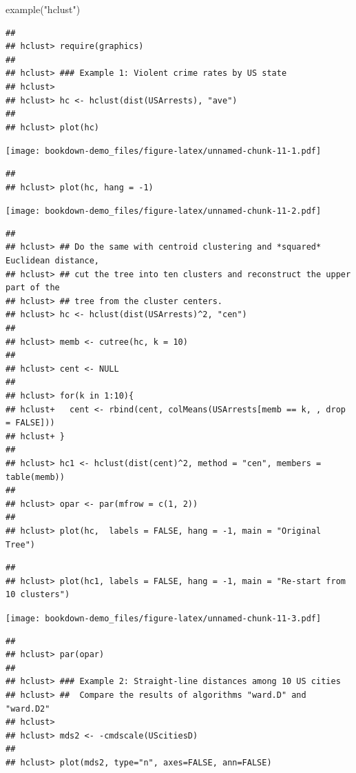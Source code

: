\documentclass[
]{book}
\newenvironment{Shaded}{\begin{snugshade}}{\end{snugshade}}
\newcommand{\FunctionTok}[1]{\textcolor[rgb]{0.00,0.00,0.00}{#1}}
\newcommand{\NormalTok}[1]{#1}
\newcommand{\StringTok}[1]{\textcolor[rgb]{0.31,0.60,0.02}{#1}}
\begin{document}
\begin{Shaded}
\begin{Highlighting}[]
\FunctionTok{example}\NormalTok{(}\StringTok{"hclust"}\NormalTok{)}
\end{Highlighting}
\end{Shaded}

\begin{verbatim}
## 
## hclust> require(graphics)
## 
## hclust> ### Example 1: Violent crime rates by US state
## hclust> 
## hclust> hc <- hclust(dist(USArrests), "ave")
## 
## hclust> plot(hc)
\end{verbatim}

\texttt{[image: bookdown-demo\_files/figure-latex/unnamed-chunk-11-1.pdf]}

\begin{verbatim}
## 
## hclust> plot(hc, hang = -1)
\end{verbatim}

\texttt{[image: bookdown-demo\_files/figure-latex/unnamed-chunk-11-2.pdf]}

\begin{verbatim}
## 
## hclust> ## Do the same with centroid clustering and *squared* Euclidean distance,
## hclust> ## cut the tree into ten clusters and reconstruct the upper part of the
## hclust> ## tree from the cluster centers.
## hclust> hc <- hclust(dist(USArrests)^2, "cen")
## 
## hclust> memb <- cutree(hc, k = 10)
## 
## hclust> cent <- NULL
## 
## hclust> for(k in 1:10){
## hclust+   cent <- rbind(cent, colMeans(USArrests[memb == k, , drop = FALSE]))
## hclust+ }
## 
## hclust> hc1 <- hclust(dist(cent)^2, method = "cen", members = table(memb))
## 
## hclust> opar <- par(mfrow = c(1, 2))
## 
## hclust> plot(hc,  labels = FALSE, hang = -1, main = "Original Tree")
\end{verbatim}

\begin{verbatim}
## 
## hclust> plot(hc1, labels = FALSE, hang = -1, main = "Re-start from 10 clusters")
\end{verbatim}

\texttt{[image: bookdown-demo\_files/figure-latex/unnamed-chunk-11-3.pdf]}

\begin{verbatim}
## 
## hclust> par(opar)
## 
## hclust> ### Example 2: Straight-line distances among 10 US cities
## hclust> ##  Compare the results of algorithms "ward.D" and "ward.D2"
## hclust> 
## hclust> mds2 <- -cmdscale(UScitiesD)
## 
## hclust> plot(mds2, type="n", axes=FALSE, ann=FALSE)
\end{verbatim}
\end{document}

